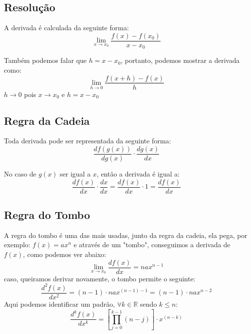 \documentclass{article}
\begin{document}
    
    \subsection{Resolução}
    A derivada é calculada da seguinte forma:
    \begin{equation*}
        \lim_{x\to x_0} \frac{f(x) - f(x_0)}{x - x_0}
    \end{equation*}

    Também podemos falar que $h = x - x_0$, portanto, podemos
    mostrar a derivada como:
    \begin{equation*}
        \lim_{h\to 0} \frac{f(x+h) - f(x)}{h}        
    \end{equation*}
    $h\to 0$ pois $x\to x_0$ e $h = x - x_0$

    \subsection{Regra da Cadeia}
    Toda derivada pode ser representada da seguinte forma:
    \begin{equation*}
        \frac{df(g(x))}{dg(x)} \cdot \frac{dg(x)}{dx}
    \end{equation*}

    No caso de $g(x)$ ser igual a $x$, então a derivada é igual a:
    \begin{equation*}
        \frac{df(x)}{dx} \cdot \frac{dx}{dx} = \frac{df(x)}{dx}
        \cdot 1 = \frac{df(x)}{dx}
    \end{equation*}

    \subsection{Regra do Tombo}
    A regra do tombo é uma das mais usadas, junto da regra da
    cadeia, ela pega, por exemplo: $f(x) = ax^n$ e através de um
    "tombo", conseguimos a derivada de $f(x)$, como podemos ver
    abaixo:
    \begin{equation*}
        \lim_{x\to x_0} \frac{df(x)}{dx} = nax^{n-1}
    \end{equation*}
    caso, queiramos derivar novamente, o tombo permite o seguinte:
    \begin{equation*}
        \frac{d^2f(x)}{dx^2} = (n-1) \cdot nax^{(n-1)-1} = (n-1)
        \cdot nax^{n-2}
    \end{equation*}
    Aqui podemos identificar um padrão, $\forall k \in \mathbb{R}$
    sendo $k \le n$:
    \begin{equation*}
        \frac{d^kf(x)}{dx^k} = [\prod_{j = 0}^{k - 1} (n - j)]
        \cdot x^{(n - k)}
    \end{equation*}
\end{document}
